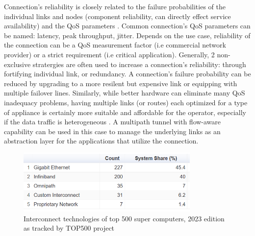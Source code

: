 Connection's reliability is closely related to the failure probabilities of the individual links and nodes (component reliability, can directly effect service availability) \cite{shooman_algorithms_1995} and the \ac{QoS} parameters \cite{gozdecki_quality_2003}.
Common connection's \ac{QoS}  parameters can be named: latency, peak throughput, jitter.
Depends on the use case, reliability of the connection can be a \ac{QoS} measurement factor (i.e commercial network provider) or a strict requirement (i.e critical application).
Generally, 2 non-exclusive stratergies are often used to increase a connection's reliability: through fortifying individual link, or redundancy.
A connection's failure probability can be reduced by upgrading to a more resilent but expensive link or equipping with multiple failover lines. 
Similarly, while better hardware can eliminate many \ac{QoS} inadequacy problems, having multiple links (or routes) each optimized for a type of appliance is certainly more suitable and affordable for the operator, especially if the data traffic is heterogeneous \cite{chen_overview_1998}.
A multipath tunnel with flow-aware capability can be used in this case to manage the underlying links as an abstraction layer for the applications that utilize the connection.  



\begin{figure}[H]
	\centering
	\includegraphics[width=0.8\textwidth]{resources/images/Interconnect_Technologies_500_supercomp.PNG}
	\caption{Interconnect technologies of top 500 super computers, 2023 edition as tracked by TOP500 project \cite{Interconnect_Technologies_500_supercomp}}
    \label{fig:introduction:Interconnect_Technologies_500_supercomp}
\end{figure}

